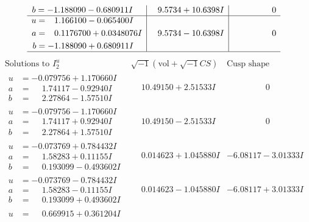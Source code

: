 \documentclass[1p]{elsarticle_modified}
\theoremstyle{definition}
\newcommand{\I}{\sqrt{-1}}
\begin{document}
$$\begin{array}{c|c|c}
\begin{aligned}
b &= -1.188090 - 0.680911 I\end{aligned}
 & \phantom{-}9.5734 + 10.6398 I & \phantom{-0.000000 } 0 \\ \hline\begin{aligned}
u &= \phantom{-}1.166100 - 0.065400 I \\
a &= \phantom{-}0.1176700 + 0.0348076 I \\
b &= -1.188090 + 0.680911 I\end{aligned}
 & \phantom{-}9.5734 - 10.6398 I & \phantom{-0.000000 } 0\\
 \hline 
 \end{array}$$\newpage$$\begin{array}{c|c|c}  
\text{Solutions to }I^u_{2}& \I (\text{vol} + \sqrt{-1}CS) & \text{Cusp shape}\\
 \hline 
\begin{aligned}
u &= -0.079756 + 1.170660 I \\
a &= \phantom{-}1.74117 - 0.92940 I \\
b &= \phantom{-}2.27864 - 1.57510 I\end{aligned}
 & \phantom{-}10.49150 + 2.51533 I & \phantom{-0.000000 } 0 \\ \hline\begin{aligned}
u &= -0.079756 - 1.170660 I \\
a &= \phantom{-}1.74117 + 0.92940 I \\
b &= \phantom{-}2.27864 + 1.57510 I\end{aligned}
 & \phantom{-}10.49150 - 2.51533 I & \phantom{-0.000000 } 0 \\ \hline\begin{aligned}
u &= -0.073769 + 0.784432 I \\
a &= \phantom{-}1.58283 + 0.11155 I \\
b &= \phantom{-}0.193099 - 0.493602 I\end{aligned}
 & \phantom{-}0.014623 + 1.045880 I & -6.08117 - 3.01333 I \\ \hline\begin{aligned}
u &= -0.073769 - 0.784432 I \\
a &= \phantom{-}1.58283 - 0.11155 I \\
b &= \phantom{-}0.193099 + 0.493602 I\end{aligned}
 & \phantom{-}0.014623 - 1.045880 I & -6.08117 + 3.01333 I \\ \hline\begin{aligned}
u &= \phantom{-}0.669915 + 0.361204 I \\

\end{aligned}
\end{array}$$
\end{document}
